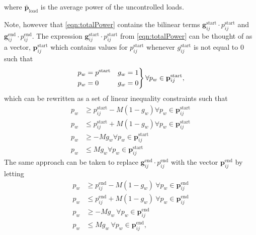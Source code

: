 where $\bar{\mathbf{p}}_{\text{load}}$ is the average power of the uncontrolled loads.
\par Note, however that \eqref{eqn:totalPower} contains the bilinear terms $\mathbf{g}_{ij}^{\text{start}}\cdot p_{ij}^{\text{start}}$ and $\mathbf{g}_{ij}^{\text{end}}\cdot p_{ij}^{\text{end}}$. The expression $\mathbf{g}_{ij}^{\text{start}}\cdot p_{ij}^{\text{start}}$ from \eqref{eqn:totalPower} can be thought of as a vector, $\mathbf{p}_{ij}^{\text{start}}$ which contains values for $p_{ij}^{\text{start}}$ whenever $g_{ij}^{\text{start}}$ is not equal to $0$ such that 
\begin{equation} \label{eqn:bilinear1}\begin{aligned}
	\begin{rcases}
		p_w = p^{\text{start}} & g_w = 1 \\
		p_w = 0                & g_w = 0 \\
	\end{rcases} \forall p_w \in \mathbf{p}_{ij}^{\text{start}},
\end{aligned} \end{equation}
which can be rewritten as a set of linear inequality constraints such that
\begin{equation} \label{eqn:onPower}\begin{aligned}
	p_w &\ge p^{\text{start}}_{ij} - M(1 - g_w) \forall p_w \in \mathbf{p}_{ij}^{\text{start}}\\
	p_w &\le p^{\text{start}}_{ij} + M(1 - g_w) \forall p_w \in \mathbf{p}_{ij}^{\text{start}}\\
	p_w &\ge -Mg_w \forall p_w \in \mathbf{p}_{ij}^{\text{start}}\\
	p_w &\le  Mg_w \forall p_w \in \mathbf{p}_{ij}^{\text{start}}
\end{aligned} \end{equation}
The same approach can be taken to replace $\mathbf{g}_{ij}^{\text{end}}\cdot p_{ij}^{\text{end}}$ with the vector $\mathbf{p}_{ij}^{\text{end}}$ by letting
\begin{equation} \label{eqn:offPower} \begin{aligned}
	p_w &\ge p^{\text{end}}_{ij} - M(1 - g_w) \ \forall p_w \in \mathbf{p}_{ij}^{\text{end}}\\
	p_w &\le p^{\text{end}}_{ij} + M(1 - g_w) \ \forall p_w \in \mathbf{p}_{ij}^{\text{end}}\\
	p_w &\ge -Mg_w \ \forall p_w \in \mathbf{p}_{ij}^{\text{end}}\\
	p_w &\le Mg_w \  \forall p_w \in \mathbf{p}_{ij}^{\text{end}},
\end{aligned} \end{equation} 
